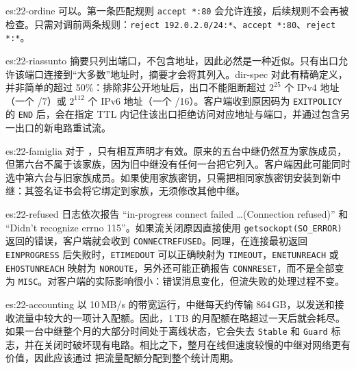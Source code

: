 \begin{soluzione}{es:22-ordine}
可以。第一条匹配规则 \texttt{accept *:80} 会允许连接，后续规则不会再被检查。只需对调前两条规则：\texttt{reject 192.0.2.0/24:*}、\texttt{accept *:80}、\texttt{reject *:*}。
\end{soluzione}

\begin{soluzione}{es:22-riassunto}
摘要只列出端口，不包含地址，因此必然是一种近似。只有出口允许该端口连接到\enquote{大多数}地址时，摘要才会将其列入。dir-spec 对此有精确定义，并非简单的超过 50\%：排除非公开地址后，出口不能阻断超过 $2^{25}$ 个 IPv4 地址（一个 /7）或 $2^{112}$ 个 IPv6 地址（一个 /16）。客户端收到原因码为 \texttt{EXITPOLICY} 的 \texttt{END} 后，会在指定 TTL 内记住该出口拒绝访问对应地址与端口，并通过包含另一出口的新电路重试流。
\end{soluzione}

\begin{soluzione}{es:22-famiglia}
对于 ，只有相互声明才有效。原来的五台中继仍然互为家族成员，但第六台不属于该家族，因为旧中继没有任何一台把它列入。客户端因此可能同时选中第六台与旧家族成员。如果使用家族密钥，只需把相同家族密钥安装到新中继：其签名证书会将它绑定到家族，无须修改其他中继。
\end{soluzione}

\begin{soluzione}{es:22-refused}
日志依次报告 \enquote{in-progress connect failed \ldots (Connection refused)} 和 \enquote{Didn't recognize errno 115}。如果流关闭原因直接使用 \texttt{getsockopt(SO\_ERROR)} 返回的错误，客户端就会收到 \texttt{CONNECTREFUSED}。同理，在连接最初返回 \texttt{EINPROGRESS} 后失败时，\texttt{ETIMEDOUT} 可以正确映射为 \texttt{TIMEOUT}，\texttt{ENETUNREACH} 或 \texttt{EHOSTUNREACH} 映射为 \texttt{NOROUTE}，另外还可能正确报告 \texttt{CONNRESET}，而不是全部变为 \texttt{MISC}。对客户端的实际影响很小：错误消息变化，但流失败的处理过程不变。
\end{soluzione}

\begin{soluzione}{es:22-accounting}
以 10\,MB/s 的带宽运行，中继每天约传输 864\,GB，以发送和接收流量中较大的一项计入配额。因此，1\,TB 的月配额在略超过一天后就会耗尽。如果一台中继整个月的大部分时间处于离线状态，它会失去 \texttt{Stable} 和 \texttt{Guard} 标志，并在关闭时破坏现有电路。相比之下，整月在线但速度较慢的中继对网络更有价值，因此应该通过  把流量配额分配到整个统计周期。
\end{soluzione}
